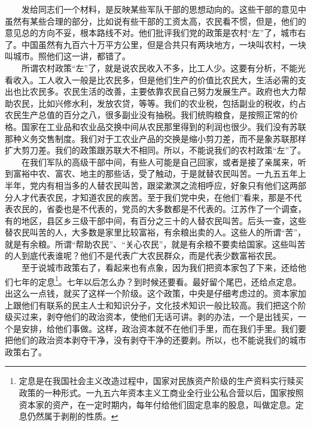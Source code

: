 \documentclass[cn,11pt,chinese]{elegantbook}
\begin{document}
　　发给同志们一个材料，是反映某些军队干部的思想动向的。这些干部的意见中虽然有某些合理的部分，比如说有些干部的工资太高，农民看不惯，但是，他们的意见总的方向不妥，根本路线不对。他们批评我们党的政策是农村“左”了，城市右了。中国虽然有九百六十万平方公里，但是合共只有两块地方，一块叫农村，一块叫城市。照他们这一讲，都错了。\\
　　所谓农村政策“左”了，就是说农民收入不多，比工人少。这要有分析，不能光看收入。工人收入一般是比农民多，但是他们生产的价值比农民大，生活必需的支出也比农民多。农民生活的改善，主要依靠农民自己努力发展生产。政府也大力帮助农民，比如兴修水利，发放农贷，等等。我们的农业税，包括副业的税收，约占农民生产总值的百分之八，很多副业没有抽税。我们统购粮食，是按照正常的价格。国家在工业品和农业品交换中间从农民那里得到的利润也很少。我们没有苏联那种义务交售制度。我们对于工农业产品的交换是缩小剪刀差，而不是象苏联那样扩大剪刀差。我们的政策跟苏联大不相同。所以，不能说我们的农村政策“左”了。\\
　　在我们军队的高级干部中间，有些人可能是自己回家，或者是接了亲属来，听到富裕中农、富农、地主的那些话，受了触动，于是就替农民叫苦。一九五五年上半年，党内有相当多的人替农民叫苦，跟梁漱溟之流相呼应，好象只有他们这两部分人才代表农民，才知道农民的疾苦。至于我们党中央，在他们”看来，那是不代表农民的，省委也是不代表的，党员的大多数都是不代表的。江苏作了一个调查，有的地区，县区乡三级干部中间，有百分之三十的人替农民叫苦。后头一查，这些替农民叫苦的人，大多数是家里比较富裕，有余粮出卖的人。这些人的所谓“苦”，就是有余粮。所谓“帮助农民”、“关心农民”，就是有余粮不要卖给国家。这些叫苦的人到底代表谁呢？他们不是代表广大农民群众，而是代表少数富裕农民。\\
　　至于说城市政策右了，看起来也有点象，因为我们把资本家包了下来，还给他们七年的定息\footnote[1]{ 定息是在我国社会主义改造过程中，国家对民族资产阶级的生产资料实行赎买政策的一种形式。一九五六年资本主义工商业全行业公私合营以后，国家按照资本家的资产，在一定时期内，每年付给他们固定息率的股息，叫做定息。定息仍然属于剥削的性质。}。七年以后怎么办？到时候还要看。最好留个尾巴，还给点定息。出这么一点钱，就买了这样一个阶级。这个政策，中央是仔细考虑过的。资本家加上跟他们有联系的民主人士和知识分子，文化技术知识一般比较高。我们把这个阶级买过来，剥夺他们的政治资本，使他们无话可讲。剥的办法，一个是出钱买，一个是安排，给他们事做。这样，政治资本就不在他们手里，而在我们手里。我们要把他们的政治资本剥夺干净，没有剥夺干净的还要剥。所以，也不能说我们的城市政策右了。\\
\end{document}
